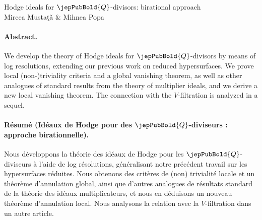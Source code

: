 \begin{center}{\Large Hodge ideals for $\jepPubBold{Q}$-divisors: birational approach}\\[1ex]Mircea Mustaţǎ \& Mihnea Popa\end{center}
\paragraph{Abstract.}
We develop the theory of Hodge ideals for $\jepPubBold{Q}$-divisors by means of log resolutions, extending our previous work on reduced hypersurfaces. We prove local (non-)triviality criteria and a global vanishing theorem, as well as other analogues of standard results from the theory of multiplier ideals, and we derive a new local vanishing theorem. The connection with the $V$-filtration is analyzed in a sequel.
\paragraph{Résumé (Idéaux de Hodge pour des $\jepPubBold{Q}$-diviseurs : approche birationnelle).}
Nous développons la théorie des idéaux de Hodge pour les $\jepPubBold{Q}$-diviseurs à l’aide de log résolutions, généralisant notre précédent travail sur les hypersurfaces réduites. Nous obtenons des critères de (non) trivialité locale et un théorème d’annulation global, ainsi que d’autres analogues de résultats standard de la théorie des idéaux multiplicateurs, et nous en déduisons un nouveau théorème d’annulation local. Nous analysons la relation avec la $V$-filtration dans un autre article.
